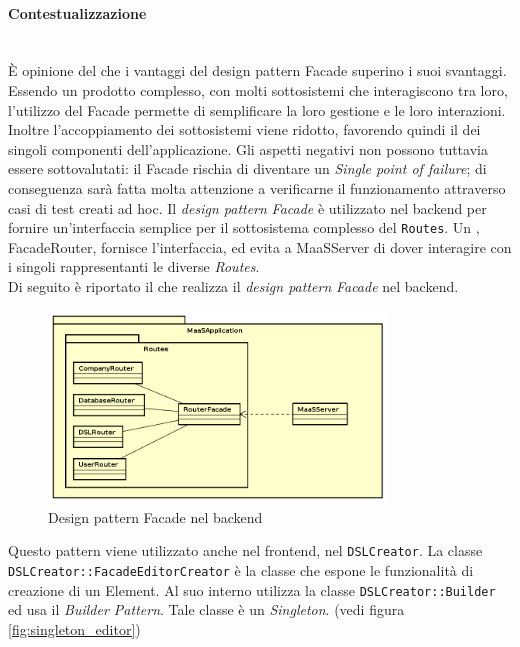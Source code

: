 \paragraph{Contestualizzazione}\mbox{} \\
È opinione del  che i vantaggi del design pattern Facade superino i suoi svantaggi. Essendo  un prodotto complesso, con molti sottosistemi che interagiscono tra loro, l'utilizzo del Facade permette di semplificare la loro gestione e le loro interazioni. Inoltre l'accoppiamento dei sottosistemi viene ridotto, favorendo quindi il  dei singoli componenti dell'applicazione. Gli aspetti negativi non possono tuttavia essere sottovalutati: il Facade rischia di diventare un \textit{Single point of failure}; di conseguenza sarà fatta molta attenzione a verificarne il funzionamento attraverso casi di test creati ad hoc.
Il \textit{design pattern} \textit{Facade} è utilizzato nel backend per fornire un'interfaccia semplice per il sottosistema complesso del  \texttt{Routes}. Un , FacadeRouter, fornisce l'interfaccia, ed evita a MaaSServer di dover interagire con i singoli  rappresentanti le diverse \textit{Routes}. \\
Di seguito è riportato il  che realizza il \textit{design pattern} \textit{Facade} nel backend.
\begin{figure}[H]
\centering
\includegraphics[width=0.8\textwidth]{res/sections/backend/facadeRoutes.png}
\caption{Design pattern Facade nel backend}
\end{figure}
Questo pattern viene utilizzato anche nel frontend, nel  \texttt{DSLCreator}. La classe \texttt{DSLCreator::FacadeEditorCreator} è la classe che espone le funzionalità di creazione di un  Element. Al suo interno utilizza la classe \texttt{DSLCreator::Builder} ed usa il \textit{Builder Pattern}. Tale classe è un \textit{Singleton}. (vedi figura \ref{fig:singleton_editor})
